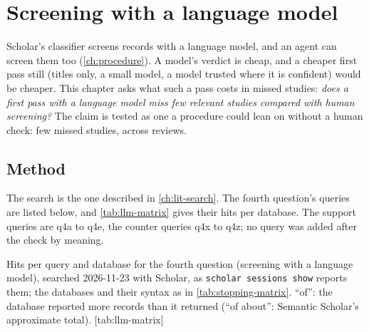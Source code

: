 \chapter{Screening with a language model}
\label{ch:llm-screening}


Scholar's classifier screens records with a language model, and an agent
can screen them too (\cref{ch:procedure}).
A model's verdict is cheap, and a cheaper first pass still (titles only,
a small model, a model trusted where it is confident) would be cheaper.
This chapter asks what such a pass costs in missed studies:
\emph{does a first pass with a language model miss few relevant studies
compared with human screening?}
The claim is tested as one a procedure could lean on without a human
check: few missed studies, across reviews.

\section{Method}
\label{sec:llm-method}

The search is the one described in \cref{ch:lit-search}.
The fourth question's queries are listed below, and
\cref{tab:llm-matrix} gives their hits per database.
The support queries are q4a to q4e, the counter queries q4x to q4z; no
query was added after the check by meaning.


\begin{table}
  \begin{sidecaption}{%
      Hits per query and database for the fourth question (screening
      with a language model), searched 2026-11-23 with Scholar, as
      \texttt{scholar sessions show} reports them; the databases and
      their syntax as in \cref{tab:stopping-matrix}.
      \enquote{of}: the database reported more records than it returned
      (\enquote{of about}: Semantic Scholar's approximate total).
    }[tab:llm-matrix]
    \footnotesize
    
  \end{sidecaption}
\end{table}

